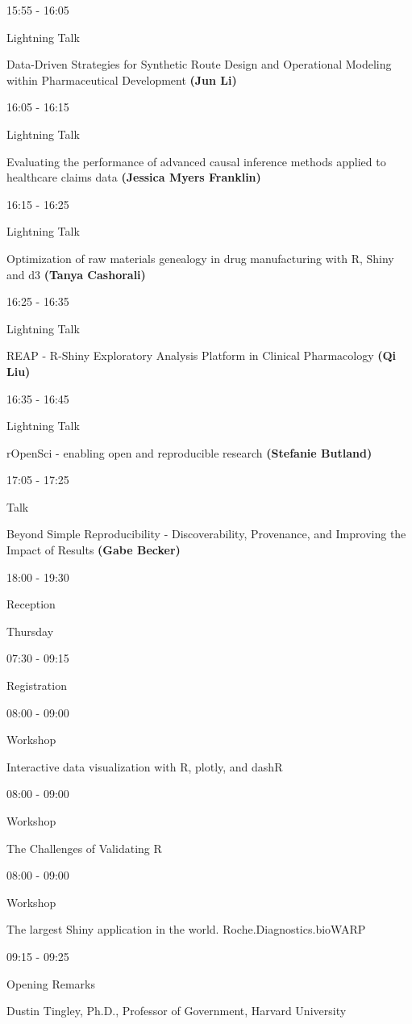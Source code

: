 \documentclass[]{book}
\theoremstyle{definition}
\theoremstyle{definition}
\theoremstyle{definition}
\theoremstyle{remark}
\begin{document}
15:55 - 16:05

Lightning Talk

Data-Driven Strategies for Synthetic Route Design and Operational
Modeling within Pharmaceutical Development \textbf{(Jun Li)}

16:05 - 16:15

Lightning Talk

Evaluating the performance of advanced causal inference methods applied
to healthcare claims data \textbf{(Jessica Myers Franklin)}

16:15 - 16:25

Lightning Talk

Optimization of raw materials genealogy in drug manufacturing with R,
Shiny and d3 \textbf{(Tanya Cashorali)}

16:25 - 16:35

Lightning Talk

REAP - R-Shiny Exploratory Analysis Platform in Clinical Pharmacology
\textbf{(Qi Liu)}

16:35 - 16:45

Lightning Talk

rOpenSci - enabling open and reproducible research \textbf{(Stefanie
Butland)}

17:05 - 17:25

Talk

Beyond Simple Reproducibility - Discoverability, Provenance, and
Improving the Impact of Results \textbf{(Gabe Becker)}

18:00 - 19:30

Reception

Thursday

07:30 - 09:15

Registration

08:00 - 09:00

Workshop

Interactive data visualization with R, plotly, and dashR

08:00 - 09:00

Workshop

The Challenges of Validating R

08:00 - 09:00

Workshop

The largest Shiny application in the world. Roche.Diagnostics.bioWARP

09:15 - 09:25

Opening Remarks

Dustin Tingley, Ph.D., Professor of Government, Harvard University
\end{document}
